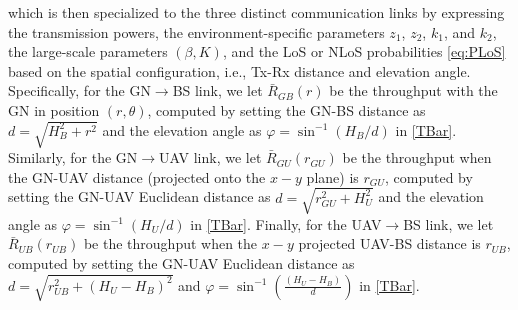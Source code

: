 \documentclass[10pt,twocolumn]{IEEEtran}
\begin{document}
which is then specialized to the three distinct communication links by expressing the transmission powers, the environment-specific parameters $z_{1}$, $z_{2}$, $k_{1}$, and $k_{2}$, the large-scale parameters $(\beta,K)$, and the LoS or NLoS probabilities \eqref{eq:PLoS} based on the spatial configuration, i.e., Tx-Rx distance and elevation angle. Specifically, for the GN$\rightarrow$BS link, we let $\bar{R}_{GB}(r)$ be the throughput with the GN in position $(r,\theta)$, computed by setting the GN-BS distance as $d{=}\sqrt{H_{B}^{2}{+}r^{2}}$ and the elevation angle as $\varphi{=}\sin^{-1}\left(H_{B}/d\right)$ in \eqref{TBar}. Similarly, for the GN$\rightarrow$UAV link, we let $\bar{R}_{GU}(r_{GU})$ be the throughput when the GN-UAV distance (projected onto the $x{-}y$ plane) is $r_{GU}$, computed by setting the GN-UAV Euclidean distance as $d{=}\sqrt{r_{GU}^{2}{+}H_{U}^{2}}$ and the elevation angle as $\varphi{=}\sin^{-1}\left(H_{U}/d\right)$ in \eqref{TBar}. Finally, for the UAV$\rightarrow$BS link, we let $\bar{R}_{UB}(r_{UB})$ be the throughput when the $x{-}y$ projected UAV-BS distance is $r_{UB}$, computed by setting the GN-UAV Euclidean distance as $d{=}\sqrt{r_{UB}^{2}{+}(H_{U}{-}H_{B})^{2}}$ and $\varphi{=}\sin^{-1}\left(\frac{(H_{U}{-}H_{B})}{d}\right)$ in \eqref{TBar}.\\

\vspace{-8mm}
\end{document}
